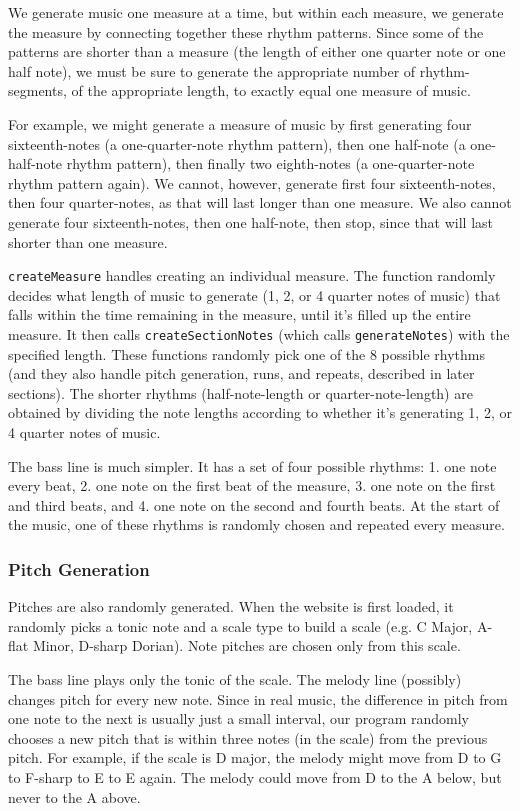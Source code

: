 \documentclass[12pt,a4paper]{article}
\newcommand{\lightcode}[1]{\colorbox{light-gray}{\texttt{#1}}}
\begin{document}
We generate music one measure at a time, but within each measure, we generate the measure by connecting together these rhythm patterns. Since some of the patterns are shorter than a measure (the length of either one quarter note or one half note), we must be sure to generate the appropriate number of rhythm-segments, of the appropriate length, to exactly equal one measure of music.

For example, we might generate a measure of music by first generating four sixteenth-notes (a one-quarter-note rhythm pattern), then one half-note (a one-half-note rhythm pattern), then finally two eighth-notes (a one-quarter-note rhythm pattern again). We cannot, however, generate first four sixteenth-notes, then four quarter-notes, as that will last longer than one measure. We also cannot generate four sixteenth-notes, then one half-note, then stop, since that will last shorter than one measure.

\lightcode{createMeasure} handles creating an individual measure. The function randomly decides what length of music to generate (1, 2, or 4 quarter notes of music) that falls within the time remaining in the measure, until it's filled up the entire measure. It then calls \lightcode{createSectionNotes} (which calls \lightcode{generateNotes}) with the specified length. These functions randomly pick one of the 8 possible rhythms (and they also handle pitch generation, runs, and repeats, described in later sections). The shorter rhythms (half-note-length or quarter-note-length) are obtained by dividing the note lengths according to whether it's generating 1, 2, or 4 quarter notes of music.

The bass line is much simpler. It has a set of four possible rhythms: 1. one note every beat, 2. one note on the first beat of the measure, 3. one note on the first and third beats, and 4. one note on the second and fourth beats. At the start of the music, one of these rhythms is randomly chosen and repeated every measure.

\subsubsection{Pitch Generation}

Pitches are also randomly generated. When the website is first loaded, it randomly picks a tonic note and a scale type to build a scale (e.g. C Major, A-flat Minor, D-sharp Dorian). Note pitches are chosen only from this scale.

The bass line plays only the tonic of the scale. The melody line (possibly) changes pitch for every new note. Since in real music, the difference in pitch from one note to the next is usually just a small interval, our program randomly chooses a new pitch that is within three notes (in the scale) from the previous pitch. For example, if the scale is D major, the melody might move from D to G to F-sharp to E to E again. The melody could move from D to the A below, but never to the A above.
\end{document}
